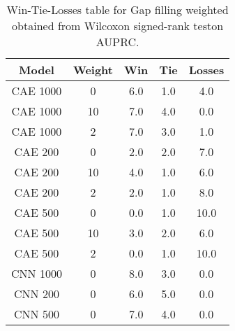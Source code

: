 \begin{table}[H]
\centering
\begin{tabular}{|c|c|c|c|c|}

\textbf{Model} & \textbf{Weight} &  \textbf{Win} &  \textbf{Tie} &  \textbf{Losses} \\
\hline

      CAE 1000 &               0 &           6.0 &           1.0 &              4.0 \\
\hline
      CAE 1000 &              10 &           7.0 &           4.0 &              0.0 \\
\hline
      CAE 1000 &               2 &           7.0 &           3.0 &              1.0 \\
\hline
       CAE 200 &               0 &           2.0 &           2.0 &              7.0 \\
\hline
       CAE 200 &              10 &           4.0 &           1.0 &              6.0 \\
\hline
       CAE 200 &               2 &           2.0 &           1.0 &              8.0 \\
\hline
       CAE 500 &               0 &           0.0 &           1.0 &             10.0 \\
\hline
       CAE 500 &              10 &           3.0 &           2.0 &              6.0 \\
\hline
       CAE 500 &               2 &           0.0 &           1.0 &             10.0 \\
\hline
      CNN 1000 &               0 &           8.0 &           3.0 &              0.0 \\
\hline
       CNN 200 &               0 &           6.0 &           5.0 &              0.0 \\
\hline
       CNN 500 &               0 &           7.0 &           4.0 &              0.0 \\
\hline

\end{tabular}
\caption{Win-Tie-Losses table for Gap filling weighted obtained from Wilcoxon signed-rank teston AUPRC.}
\label{tab:gap_filling_weighted_weighted_comparison_all}
\end{table}